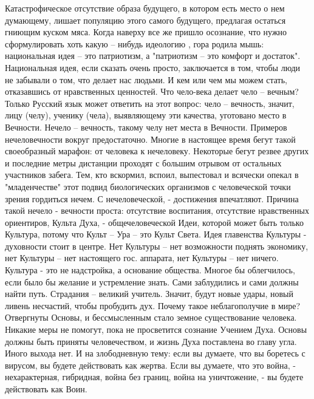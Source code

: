 \obeycr
Катастрофическое отсутствие образа будущего, в котором есть место о нем думающему, лишает популяцию этого самого будущего, предлагая остаться гниющим куском мяса. 
Когда наверху все же пришло осознание, что нужно сформулировать хоть какую – нибудь  идеологию , гора родила мышь: национальная идея – это патриотизм, а "патриотизм – это комфорт и достаток". 
Национальная идея, если сказать очень просто, заключается в том, чтобы люди не забывали о том, что делает нас людьми. 
И кем или чем мы можем стать, отказавшись от нравственных ценностей.
Что чело-века делает чело – вечным?
Только Русский язык может ответить на этот вопрос: 
чело – вечность, значит, лицу (челу), ученику (чела), выявляющему эти качества, уготовано место в Вечности.
Нечело – вечность, такому челу нет места в Вечности.
Примеров нечеловечности вокруг предостаточно.
Многие в настоящее время бегут такой своеобразный марафон: от человека к нечеловеку. 
Некоторые бегут резвее других и последние метры дистанции проходят с большим отрывом от остальных участников забега. Тем, кто вскормил, вспоил, выпестовал и всячески опекал в "младенчестве" этот подвид биологических организмов с человеческой точки зрения гордиться нечем.
С нечеловеческой, - достижения впечатляют.  
Причина такой нечело - вечности проста: 
отсутствие воспитания, 
отсутствие нравственных ориентиров, 
Культа Духа, -  
общечеловеческой Идеи, которой может быть только Культура, потому что Культ – Ура – это Культ Света.
Идея главенства Культуры - духовности стоит в центре.
Нет Культуры – нет возможности поднять экономику, 
нет Культуры – нет настоящего гос. аппарата, 
нет Культуры – нет ничего. 
Культура - это не  надстройка, а основание общества.
Многое бы облегчилось, если было бы желание и устремление знать. 
Сами заблудились и сами должны найти путь. 
Страдания – великий учитель.
Значит, будут новые удары, новый ливень несчастий, чтобы пробудить дух.
Почему такое неблагополучие в мире?
Отвергнуты Основы, и бессмысленным стало земное существование человека.
Никакие меры не помогут, пока не просветится сознание Учением Духа. 
Основы должны быть приняты человечеством, и жизнь Духа поставлена во главу угла. Иного выхода нет.
И на злободневную тему: если вы думаете, что вы боретесь с вирусом, вы будете действовать как жертва.
Если вы думаете, что это война, -  нехарактерная, гибридная, война без границ, война на уничтожение, - вы будете действовать как Воин.
\restorecr
